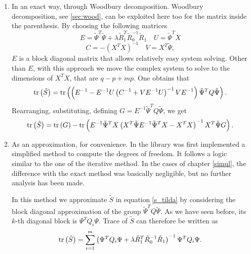 \begin{enumerate}
	\item In an exact way, through Woodbury decomposition. Woodbury
	      decomposition, see \ref{sec:wood}, can be exploited here too
	      for the matrix inside the parenthesis. By choosing the following matrices
	      \begin{equation}
		      E = \tilde{\Psi}^T\tilde{\Psi} +  \lambda \tilde{R}_1^T
		      \tilde{R}_0^{-1} \tilde{R}_1
		      \quad U =
		      \tilde{\Psi}^TX
	      \end{equation}
	      \begin{equation*}
		      C = - \left( X^TX \right)^{-1}
		      \quad V = X^T \tilde{\Psi},
	      \end{equation*} $E$ is a block diagonal matrix that allows relatively easy system
	      solving. Other than $E$, with this approach we move the complex system to solve
	      to the dimensions of $X^TX$, that are $q-p+mp$. One obtains that
	      \begin{equation}
		      \operatorname*{tr} \left(\tilde{S} \right) =
		      \operatorname*{tr} \left(  \left( E^{-1} - E^{-1}U\left(C^{-1} + V E^{-1}U\right)^{-1}V E^{-1} \right)
		      \tilde{\Psi}^TQ \tilde{\Psi} \right).
	      \end{equation}
	      Rearranging, substituting, defining $G=E^{-1}\tilde{\Psi}^TQ
		      \tilde{\Psi}$, we get
	      \begin{equation}
		      \operatorname*{tr} \left(\tilde{S} \right) =
		      \operatorname*{tr} \left(G\right)  -
		      \operatorname*{tr} \left(  E^{-1}\tilde{\Psi}^TX\left(X^T \tilde{\Psi} E^{-1}\tilde{\Psi}^TX - X^TX\right)^{-1}X^T \tilde{\Psi} G\right).
	      \end{equation}
	\item As an approximation, for convenience. In the library was first implemented a simplified method to
	      compute the degrees of freedom. It follows a logic similar to the one of the
	      iterative method. In the cases of chapter \ref{simul}, the difference with the exact method
	      was basically negligible, but no further analysis has been made.

	      In this method we approximate $\tilde{S}$ in equation \ref{s_tilda} by
	      considering the block diagonal approximation of the group
	      $\tilde{\Psi}^TQ\tilde{\Psi}$. As we have seen before, its $k$-th diagonal
	      block is $\Psi^TQ_i\Psi$. Trace of $\tilde{S}$ can therefore be written as
	      \begin{equation}
		      \operatorname*{tr} \left(\tilde{S} \right) = \sum_{i=1}^{m} \left( \Psi^TQ_i\Psi  +  \lambda \tilde{R}_1^T \tilde{R}_0^{-1} \tilde{R}_1\right)^{-1}   \Psi^TQ_i\Psi .
	      \end{equation}


\end{enumerate}
